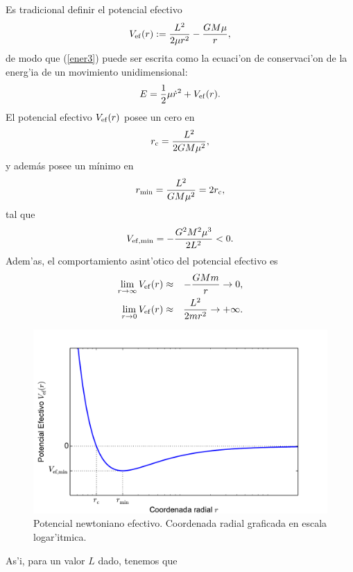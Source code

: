 Es tradicional definir el potencial efectivo
\begin{equation}
V_{\rm ef}(r):=\frac{L^2}{2\mu r^2}-\frac{GM\mu}{r},
\end{equation}
de modo que (\ref{ener3}) puede ser escrita como la ecuaci'on de conservaci'on de la energ'ia de un movimiento unidimensional:
\begin{equation}
E=\frac{1}{2}\mu\dot{r}^2+V_{\rm ef}(r) . \label{EVef}
\end{equation}
El potencial efectivo $V_{\rm ef}(r)$ posee un cero en
\begin{eqnarray}
r_{\rm c}=\frac{L^2}{2GM\mu^2} ,\label{cero1}
\end{eqnarray}
y adem\'as posee un m\'inimo en
\begin{eqnarray}
r_{\rm min}=\frac{L^2}{GM\mu^2}=2r_{\rm c},\label{rmin}
\end{eqnarray}
tal que
\begin{eqnarray}
V_{\rm ef, min}=-\frac{G^2M^2\mu^3}{2L^2}<0.
\end{eqnarray}
Adem'as, el comportamiento asint'otico del potencial efectivo es
\begin{eqnarray}
\lim_{r\to\infty}V_{\rm ef}(r)&\approx&-\frac{GMm}{r}\rightarrow 0,\\
\lim_{r\to 0}V_{\rm ef}(r)&\approx&\frac{L^2}{2mr^2}\rightarrow +\infty .
\end{eqnarray}
\begin{figure}[H]
 \begin{center}
\includegraphics[width=12cm]{fig/fig-potencial-newtoniano.pdf}
\caption{Potencial newtoniano efectivo. Coordenada radial graficada en escala logar'itmica.}
\label{fig:pne}
\end{center}
\end{figure}
As'i, para un valor $L$ dado, tenemos que
